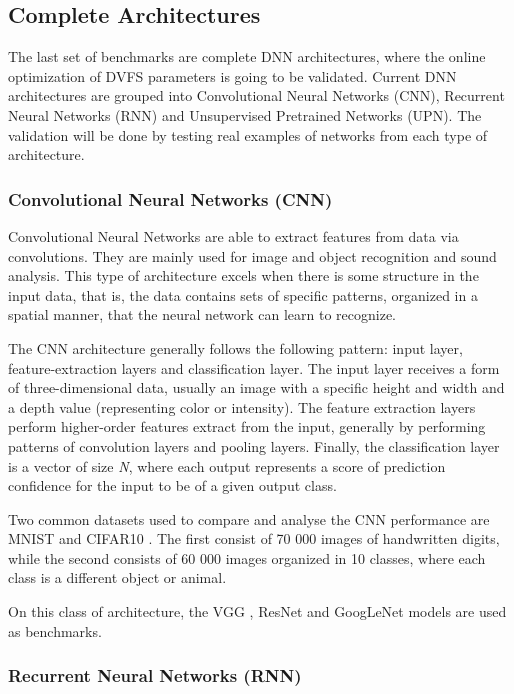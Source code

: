 \subsection{Complete Architectures}
\label{sec:compArch}

The last set of benchmarks are complete DNN architectures, where the online optimization of DVFS parameters is going to be validated. Current DNN architectures are grouped into Convolutional Neural Networks (CNN), Recurrent Neural Networks (RNN) and Unsupervised Pretrained Networks (UPN). The validation will be done by testing real examples of networks from each type of architecture.


\subsubsection{Convolutional Neural Networks (CNN)}
Convolutional Neural Networks are able to extract features from data via convolutions. They are mainly used for image and object recognition and sound analysis. This type of architecture excels when there is some structure in the input data, that is, the data contains sets of specific patterns, organized in a spatial manner, that the neural network can learn to recognize.

The CNN architecture generally follows the following pattern: input layer, feature-extraction layers and classification layer. The input layer receives a form of three-dimensional data, usually an image with a specific height and width and a depth value (representing color or intensity). The feature extraction layers perform higher-order features extract from the input, generally by performing patterns of convolution layers and pooling layers. Finally, the classification layer is a vector of size \textit{N}, where each output represents a score of prediction confidence for the input to be of a given output class.

Two common datasets used to compare and analyse the CNN  performance are MNIST \cite{noauthor_mnist_1999} and CIFAR10 \cite{noauthor_cifar-10_2010}. The first consist of 70 000 images of handwritten digits, while the second consists of 60 000 images organized in 10 classes, where each class is a different object or animal.

On this class of architecture, the VGG \cite{simonyan_very_2015}, ResNet \cite{he_deep_2015} and GoogLeNet \cite{szegedy_going_2014} models are used as benchmarks.

\subsubsection{Recurrent Neural Networks (RNN)}

